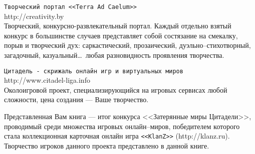 \noindent \texttt{Творческий портал <<Terra Ad Caelum>>} \\
http://creativity.by\\
Творческий, конкурсно-развлекательный портал. Каждый отдельно взятый 
конкурс в 
большинстве случаев представляет собой состязание на смекалку, порыв и 
творческий дух: саркастический, прозаический, дуэльно--стихотворный, 
загадочный, казуальный\ldots\ любая разновидность проявления 
творчества.

\vspace{6mm}

\noindent \texttt{Цитадель - скрижаль онлайн игр и виртуальных миров}\\
http://www.citadel-liga.info\\
Околоигровой проект, специализирующийся на 
игровых сервисах любой сложности, цена создания --- Ваше творчество.

\vspace{12mm}

\noindent Представленная Вам книга --- итог конкурса <<Затерянные миры 
Цитадели>>, проводимый среди множества игровых онлайн--миров, победителем 
которого стала коллекционная карточная онлайн игра \texttt{<<KlanZ>>} 
(http://klanz.ru). Творчество игроков данного проекта представлено в данной 
книге.